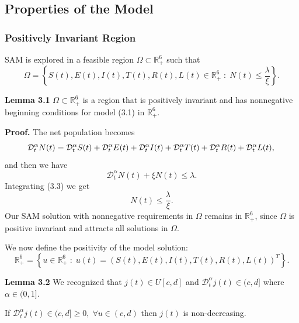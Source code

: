 \documentclass[10pt]{NSP1}
\newcommand{\CD}{\mathcal{D}}
\begin{document}
\subsection{\bfseries Properties of the Model}

\subsubsection{Positively Invariant Region}

SAM is explored in a feasible region $\Omega \subset \mathbb{R}_{+}^{6}$ such that
\begin{equation}
\Omega = \left\{ S(t),E(t),I(t),T(t),R(t),L(t) \in \mathbb{R}_{+}^{6} \;:\; N(t) \leq \frac{\lambda}{\xi} \right\}.
\tag{3.2}
\end{equation}

\textbf{Lemma 3.1} $\Omega \subset \mathbb{R}_{+}^{6}$ is a region that is positively invariant and has nonnegative beginning conditions for model (3.1) in $\mathbb{R}_{+}^{6}$.

\textbf{Proof.} The net population becomes
\begin{equation}
  \CD_t^\alpha N(t) =   \CD_t^\alpha S(t) +   \CD_t^\alpha E(t) +   \CD_t^\alpha I(t) +   \CD_t^\alpha T(t) +   \CD_t^\alpha R(t) +   \CD_t^\alpha L(t),
\notag \\\end{equation}
and then we have
\begin{equation}
  \CD_t^\alpha N(t) + \xi N(t) \leq \lambda.
\tag{3.3}
\end{equation}
Integrating (3.3) we get
\begin{equation}
N(t) \leq \frac{\lambda}{\xi}.
\tag{3.4}
\end{equation}
Our SAM solution with nonnegative requirements in $\Omega$ remains in $\mathbb{R}_{+}^{6}$, since $\Omega$ is positive invariant and attracts all solutions in $\Omega$.

We now define the positivity of the model solution:
\begin{equation}
\mathbb{R}_{+}^{6} = \left\{ u \in \mathbb{R}_{+}^{6} \;:\; u(t) = (S(t),E(t),I(t),T(t),R(t),L(t))^{T} \right\}.
\tag{3.5}
\end{equation}

\textbf{Lemma 3.2} We recognized that $j(t) \in U[c,d]$ and $  \CD_t^\alpha j(t) \in (c,d]$ where $\alpha \in (0,1]$. 

If $  \CD_t^\alpha j(t) \in (c,d] \ge 0,\; \forall u \in (c,d)$ then $j(t)$ is non-decreasing. 
\end{document}
